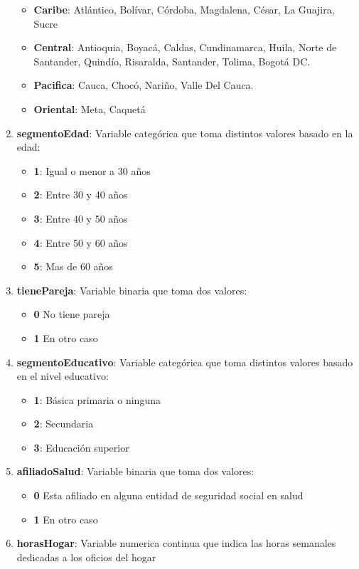 \documentclass[12pt,a4paper]{article}
\begin{document}
\begin{enumerate}
		\begin{itemize}
			\item \textbf{Caribe}: Atlántico, Bolívar, Córdoba, Magdalena, César, La Guajira, Sucre
			\item \textbf{Central}: Antioquia, Boyacá, Caldas, Cundinamarca, Huila, Norte de Santander, Quindío, Risaralda, Santander, Tolima, Bogotá DC.
			\item \textbf{Pacifica}: Cauca, Chocó, Nariño,	Valle Del Cauca.
			\item \textbf{Oriental}: Meta, Caquetá
		\end{itemize}
		\item \textbf{segmentoEdad}: Variable  categórica que toma distintos valores basado en la edad:
		\begin{itemize}
			\item \textbf{1}: Igual o menor a 30 años
			\item \textbf{2}: Entre 30 y 40 años
			\item \textbf{3}: Entre 40 y 50 años
			\item \textbf{4}: Entre 50 y 60 años
			\item \textbf{5}: Mas de 60 años
		\end{itemize}
		\item \textbf{tienePareja}: Variable binaria que toma dos valores:
		\begin{itemize}
			\item \textbf{0} No tiene pareja
			\item \textbf{1} En otro caso
		\end{itemize}
		\item \textbf{segmentoEducativo}: Variable  categórica que toma distintos valores basado en el nivel educativo:
		\begin{itemize}
			\item \textbf{1}: Básica primaria o ninguna
			\item \textbf{2}: Secundaria
			\item \textbf{3}: Educación superior
		\end{itemize}
		\item \textbf{afiliadoSalud}: Variable binaria que toma dos valores:
		\begin{itemize}
			\item \textbf{0} Esta afiliado en alguna entidad de seguridad social en salud
			\item \textbf{1} En otro caso
		\end{itemize}
		\item \textbf{horasHogar}: Variable numerica continua que indica las horas semanales dedicadas a los oficios del hogar

\end{enumerate}
\end{document}
